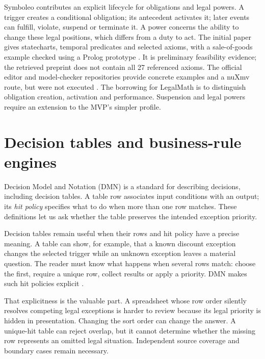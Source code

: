 \documentclass[12pt,a4paper,oneside,openany]{book}
\begin{document}
Symboleo contributes an explicit lifecycle for obligations and legal powers.
A trigger creates a conditional obligation; its antecedent activates it; later
events can fulfill, violate, suspend or terminate it. A power concerns the ability
to change these legal positions, which differs from a duty to act. The initial
paper gives statecharts, temporal predicates and selected axioms, with a
sale-of-goods example checked using a Prolog prototype
\citep[secs.~III--IV]{symboleo2020}. It is preliminary feasibility evidence;
the retrieved preprint does not contain all 27 referenced axioms. The official
editor and model-checker repositories provide concrete examples and a nuXmv
route, but were not executed \citep{symboleocode}. The borrowing for LegalMath
is to distinguish obligation creation, activation and performance. Suspension
and legal powers require an extension to the MVP's simpler profile.

\section{Decision tables and business-rule engines}
\label{merge:M04:09}

\label{sec:languages-tables}
Decision Model and Notation (DMN) is a standard for describing decisions,
including decision tables. A table row associates input conditions with an
output; its \emph{hit policy} specifies what to do when more than one row
matches. These definitions let us ask whether the table preserves the intended
exception priority.

Decision tables remain useful when their rows and hit policy have a precise
meaning. A table can show, for example, that a known discount exception changes
the selected trigger while an unknown exception leaves a material question.
The reader must know what happens when several rows match: choose the first,
require a unique row, collect results or apply a priority. DMN makes such hit
policies explicit \citep[sec.~8.2.11]{dmn2024}.

That explicitness is the valuable part. A spreadsheet whose row order silently
resolves competing legal exceptions is harder to review because its legal
priority is hidden in presentation. Changing the sort order can change the
answer. A unique-hit table can reject overlap, but it cannot determine whether
the missing row represents an omitted legal situation. Independent source
coverage and boundary cases remain necessary.
\end{document}
